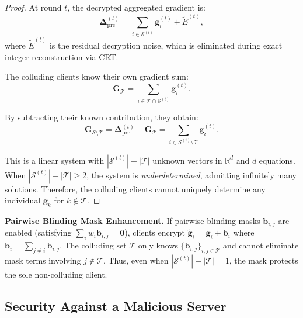 \begin{proof}
At round $t$, the decrypted aggregated gradient is:
\begin{equation}
    \mathbf{\Delta}_{\mathrm{pre}}^{(t)} = \sum_{i \in \mathcal{S}^{(t)}} \mathbf{g}_i^{(t)} + \tilde{E}^{(t)},
\end{equation}
where $\tilde{E}^{(t)}$ is the residual decryption noise, which is eliminated during exact integer reconstruction via CRT.

The colluding clients know their own gradient sum:
\begin{equation}
    \mathbf{G}_{\mathcal{T}} = \sum_{i \in \mathcal{T} \cap \mathcal{S}^{(t)}} \mathbf{g}_i^{(t)}.
\end{equation}

By subtracting their known contribution, they obtain:
\begin{equation}
    \mathbf{G}_{\mathcal{S} \setminus \mathcal{T}} = \mathbf{\Delta}_{\mathrm{pre}}^{(t)} - \mathbf{G}_{\mathcal{T}} = \sum_{i \in \mathcal{S}^{(t)} \setminus \mathcal{T}} \mathbf{g}_i^{(t)}.
\end{equation}

This is a linear system with $|\mathcal{S}^{(t)}| - |\mathcal{T}|$ unknown vectors in $\mathbb{R}^d$ and $d$ equations. When $|\mathcal{S}^{(t)}| - |\mathcal{T}| \geq 2$, the system is \emph{underdetermined}, admitting infinitely many solutions. Therefore, the colluding clients cannot uniquely determine any individual $\mathbf{g}_k$ for $k \notin \mathcal{T}$.
\end{proof}

\noindent\textbf{Pairwise Blinding Mask Enhancement.}
If pairwise blinding masks $\mathbf{b}_{i,j}$ are enabled (satisfying $\sum_i w_i \mathbf{b}_{i,j} = \mathbf{0}$), clients encrypt $\tilde{\mathbf{g}}_i = \mathbf{g}_i + \mathbf{b}_i$ where $\mathbf{b}_i = \sum_{j \neq i} \mathbf{b}_{i,j}$. The colluding set $\mathcal{T}$ only knows $\{\mathbf{b}_{i,j}\}_{i,j \in \mathcal{T}}$ and cannot eliminate mask terms involving $j \notin \mathcal{T}$. Thus, even when $|\mathcal{S}^{(t)}| - |\mathcal{T}| = 1$, the mask protects the sole non-colluding client.

\subsection{Security Against a Malicious Server}
\label{ssec:malicious-server}

